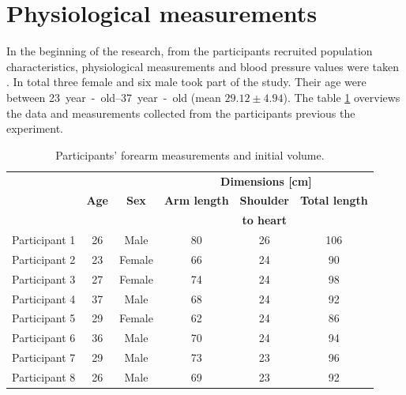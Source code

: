 

\section{Physiological measurements}
\label{section5.1}
In the beginning of the research, from the participants recruited population characteristics, physiological measurements and blood pressure values were taken . In total three female and six male took part of the study. Their age were between \SIrange{23}{37}{year-old} (mean $29.12 \pm 4.94$). The table \ref{tbl:physiological} overviews the data and measurements collected from the participants previous the experiment.

\begin{table}[htbp] %
	\caption{Participants' forearm measurements and initial volume.}
	\label{tbl:physiological}
	\centering
	\begin{tabular}{lcc|ccc}
		\toprule
		&              &              &         \multicolumn{3}{c}{\textbf{Dimensions [\si{\cm}]}}         \\
		& \textbf{Age} & \textbf{Sex} & \textbf{Arm length} & \textbf{Shoulder} & \textbf{Total length} \\
		&              &              &                     &  \textbf{to heart}   &                       \\ \midrule
		Participant 1 &      26      &     Male     &         80          &          26          &          106          \\
		Participant 2 &      23      &    Female    &         66          &          24          &          90           \\
		Participant 3 &      27      &    Female    &         74          &          24          &          98           \\
		Participant 4 &      37      &     Male     &         68          &          24          &          92           \\
		Participant 5 &      29      &    Female    &         62          &          24          &          86           \\
		Participant 6 &      36      &     Male     &         70          &          24          &          94           \\
		Participant 7 &      29      &     Male     &         73          &          23          &          96           \\
		Participant 8 &      26      &     Male     &         69          &          23          &          92           \\ \bottomrule
	\end{tabular}
\end{table}

